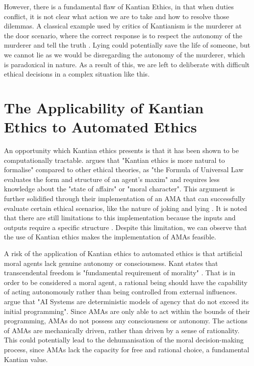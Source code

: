 \documentclass{article}
\begin{document}
However, there is a fundamental flaw of Kantian Ethics, in that when duties conflict, it is
not clear what action we are to take and how to resolve those dilemmas. A classical example used by
critics of Kantianism is the murderer at the door scenario, where the correct response is to respect
the autonomy of the murderer and tell the truth \parencite[p. 81]{bennet2015}. Lying could potentially 
save the life of someone, but we cannot lie as we would be disregarding the autonomy of the murderer, which
is paradoxical in nature. As a result of this, we are left to deliberate with difficult ethical decisions in
a complex situation like this.
\section{The Applicability of Kantian Ethics to Automated Ethics}

An opportunity which Kantian ethics presents is that it has been shown to be computationally
tractable. \textcite[p. 16]{singh2022} argues that "Kantian ethics is more natural to formalise" compared
to other ethical theories, as "the Formula of Universal Law evaluates the form and structure of an agent's
maxim" and requires less knowledge about the "state of affairs" or "moral character". This argument is 
further solidified through their implementation of an AMA that can successfully evaluate certain
ethical scenarios, like the nature of joking and lying \parencite[6--7]{singh2022}. It is noted that
there are still limitations to this implementation because the inputs and outputs require a specific
structure \parencite[p. 10]{singh2022}. Despite this limitation, we can observe that the use of Kantian
ethics makes the implementation of AMAs feasible.

A risk of the application of Kantian ethics to automated ethics is that artificial moral agents lack
genuine autonomy or consciousness. Kant states that transcendental freedom is "fundamental requirement of morality"
\parencite[p. 142]{mannananth2021}. That is in order to be considered a moral agent, a rational being should 
have the capability of acting autonomously rather than being controlled from external influences. \textcite[p. 149]{mannananth2021}
argue that "AI Systems are deterministic models of agency that do not exceed its initial programming". Since AMAs are
only able to act within the bounds of their programming, AMAs do not possess any consciousness or autonomy. The actions
of AMAs are mechanically driven, rather than driven by a sense of rationality. This could potentially lead to the
dehumanisation of the moral decision-making process, since AMAs lack the capacity for free and rational choice, a fundamental
Kantian value.
\end{document}
